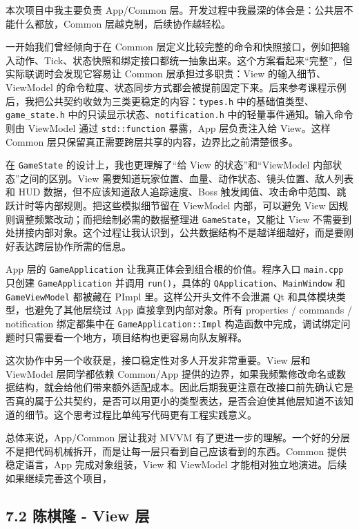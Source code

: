 \documentclass[12pt,fontset=none]{ctexart}
\begin{document}
本次项目中我主要负责 App/Common 层。开发过程中我最深的体会是：公共层不能什么都放，Common 层越克制，后续协作越轻松。

一开始我们曾经倾向于在 Common 层定义比较完整的命令和快照接口，例如把输入动作、Tick、状态快照和绑定接口都统一抽象出来。这个方案看起来“完整”，但实际联调时会发现它容易让 Common 层承担过多职责：View 的输入细节、ViewModel 的命令粒度、状态同步方式都会被提前固定下来。后来参考课程示例后，我把公共契约收敛为三类更稳定的内容：\texttt{types.h} 中的基础值类型、\texttt{game\_state.h} 中的只读显示状态、\texttt{notification.h} 中的轻量事件通知。输入命令则由 ViewModel 通过 \texttt{std::function} 暴露，App 层负责注入给 View。这样 Common 层只保留真正需要跨层共享的内容，边界比之前清楚很多。

在 \texttt{GameState} 的设计上，我也更理解了“给 View 的状态”和“ViewModel 内部状态”之间的区别。View 需要知道玩家位置、血量、动作状态、镜头位置、敌人列表和 HUD 数据，但不应该知道敌人追踪速度、Boss 触发阈值、攻击命中范围、跳跃计时等内部规则。把这些模拟细节留在 ViewModel 内部，可以避免 View 因规则调整频繁改动；而把绘制必需的数据整理进 \texttt{GameState}，又能让 View 不需要到处拼接内部对象。这个过程让我认识到，公共数据结构不是越详细越好，而是要刚好表达跨层协作所需的信息。

App 层的 \texttt{GameApplication} 让我真正体会到组合根的价值。程序入口 \texttt{main.cpp} 只创建 \texttt{GameApplication} 并调用 \texttt{run()}，具体的 \texttt{QApplication}、\texttt{MainWindow} 和 \texttt{GameViewModel} 都被藏在 PImpl 里。这样公开头文件不会泄漏 Qt 和具体模块类型，也避免了其他层绕过 App 直接拿到内部对象。所有 properties / commands / notification 绑定都集中在 \texttt{GameApplication::Impl} 构造函数中完成，调试绑定问题时只需要看一个地方，项目结构也更容易向队友解释。

这次协作中另一个收获是，接口稳定性对多人开发非常重要。View 层和 ViewModel 层同学都依赖 Common/App 提供的边界，如果我频繁修改命名或数据结构，就会给他们带来额外适配成本。因此后期我更注意在改接口前先确认它是否真的属于公共契约，是否可以用更小的类型表达，是否会迫使其他层知道不该知道的细节。这个思考过程比单纯写代码更有工程实践意义。

总体来说，App/Common 层让我对 MVVM 有了更进一步的理解。一个好的分层不是把代码机械拆开，而是让每一层只看到自己应该看到的东西。Common 提供稳定语言，App 完成对象组装，View 和 ViewModel 才能相对独立地演进。后续如果继续完善这个项目，

\subsection{7.2 陈棋隆 - View 层}
\end{document}
